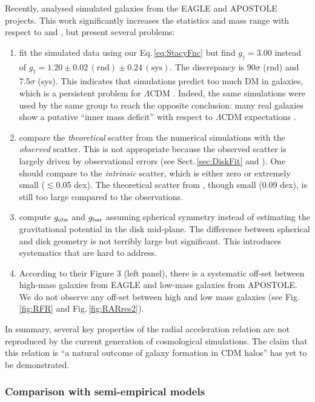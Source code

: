 \documentclass[apjl, twocolappendix]{emulateapj}
\begin{document}
Recently, \citet{Ludlow2016} analysed simulated galaxies from the EAGLE and APOSTOLE projects. This work significantly increases the statistics and mass range with respect to \citet{Santos2016} and \citet{Keller2016}, but present several problems:
\begin{enumerate}
 \item \citet{Ludlow2016} fit the simulated data using our Eq.\,\ref{eq:StacyFnc} but find $g_{\dag}=3.00$ instead of $g_{\dag} = 1.20 \pm 0.02\,\mathrm{(rnd)} \pm 0.24 \,\mathrm{(sys)}$. The discrepancy is 90$\sigma$ (rnd) and 7.5$\sigma$ (sys). This indicates that simulations predict too much DM in galaxies, which is a persistent problem for $\Lambda$CDM \citep[e.g.,][]{McGaugh2007, Kuzio2009}. Indeed, the same simulations were used by the same group to reach the opposite conclusion: many real galaxies show a putative ``inner mass deficit'' with respect to $\Lambda$CDM expectations \citep{Oman2015}.
 \item \citet{Ludlow2016} compare the \textit{theoretical} scatter from the numerical simulations with the \textit{observed} scatter. This is not appropriate because the observed scatter is largely driven by observational errors (see Sect.\,\ref{sec:DiskFit} and \citealt{McGaugh2016}). One should compare to the \textit{intrinsic} scatter, which is either zero or extremely small ($\lesssim$0.05 dex). The theoretical scatter from \citet{Ludlow2016}, though small (0.09 dex), is still too large compared to the observations.
 \item \citet{Ludlow2016} compute $g_{\rm obs}$ and $g_{\rm bar}$ assuming spherical symmetry instead of estimating the gravitational potential in the disk mid-plane. The difference between spherical and disk geometry is not terribly large but significant. This introduces systematics that are hard to address.
 \item According to their Figure 3 (left panel), there is a systematic off-set between high-mass galaxies from EAGLE and low-mass galaxies from APOSTOLE. We do not observe any off-set between high and low mass galaxies (see Fig.\,\ref{fig:RFR} and Fig.\,\ref{fig:RARres2}).
\end{enumerate}
In summary, several key properties of the radial acceleration relation are not reproduced by the current generation of cosmological simulations. The claim that this relation is ``a natural outcome of galaxy formation in CDM halos'' has yet to be demonstrated.

\subsubsection{Comparison with semi-empirical models}
\end{document}
